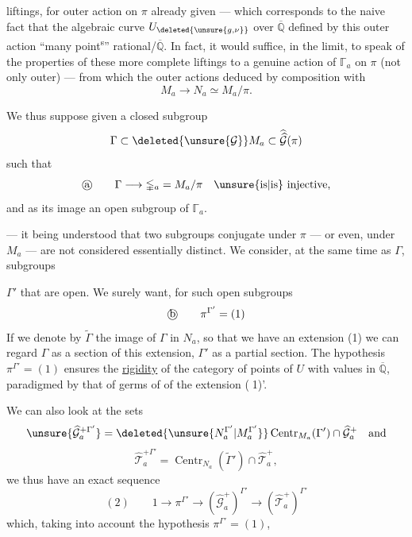 
 liftings, for  outer action on $\pi$ already given --- which corresponds to the naive fact that the algebraic curve $U_{\deleted{\unsure{g,\nu}}}$ over $\overline{\mathbb Q}$ defined by this outer action  ``many point\textsuperscript{s}'' rational/$\overline{\mathbb Q}$. In fact, it would suffice, in the limit, to speak of the  properties of these more complete liftings to a genuine action of  $\mathbb{\Gamma}_a$ on $\pi$ (not only outer) --- from which the outer actions   deduced by composition with
\[
M_a \longrightarrow N_a \simeq M_a/\pi.
\]

 We thus suppose given a closed subgroup
\[
\Gamma \subset \deleted{\unsure{\mathcal G}} M_a \subset \widehat{\widehat{\mathcal G}}(\pi)
\]
such that
\[
\text{\textcircled{a}}\qquad
\Gamma \longrightarrow \mathbb{\Gamma}_a
 = M_a/\pi
\quad \text{\unsure{is|is} injective,}
\]
and  as its image an open subgroup of $\mathbb{\Gamma}_a$.

--- it being understood that two subgroups conjugate under $\pi$ --- or even,  under $M_a$ --- are not considered essentially distinct. We consider, at the same time as $\Gamma$, subgroups


$\Gamma'$ that are open. We surely want, for such open subgroups
\[
\text{\textcircled{b}}\qquad \pi^{\Gamma'}=(1)
\]
If we denote by $\widetilde{\Gamma}$ the image of $\Gamma$ in $N_a$, so that we have an extension
(1)\quad
{}
we can regard $\Gamma$ as a section of this extension, $\Gamma'$ as a partial section. The hypothesis $\pi^{\Gamma'}=(1)$ ensures the \uline{rigidity} of the category of points of $U$ with values in $\overline{\mathbb Q}$, paradigmed by that of germs of  of the extension \textcircled{(1)'}.

We can also look at the sets
\[
\unsure{\widehat{\mathcal G}_a^{+\Gamma'}}
=
\deleted{\unsure{N_a^{\Gamma'}|M_a^{\Gamma'}}}
\operatorname{Centr}_{M_a}(\Gamma')\cap\widehat{\mathcal G}_a^+
\quad\text{and}
\]
\[
\widehat{\mathcal T}_a^{+\Gamma'}
=\operatorname{Centr}_{N_a}(\widetilde{\Gamma}')\cap\widehat{\mathcal T}_a^+,
\]
 we thus have an exact sequence
\[
(2)\qquad 1\longrightarrow\pi^{\Gamma'}\longrightarrow
(\widehat{\mathcal G}_a^+)^{\Gamma'}\longrightarrow
(\widehat{\mathcal T}_a^+)^{\Gamma'}
\]
which, taking into account the hypothesis $\pi^{\Gamma'}=(1)$,

